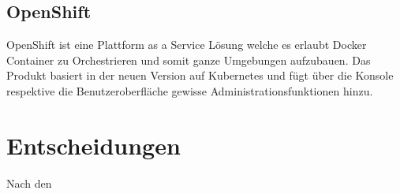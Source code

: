 \subsection{OpenShift}

OpenShift ist eine Plattform as a Service Lösung welche es erlaubt Docker Container zu Orchestrieren und somit ganze Umgebungen aufzubauen. Das Produkt basiert in der neuen Version auf Kubernetes und fügt über die Konsole respektive die Benutzeroberfläche gewisse Administrationsfunktionen hinzu. 

\section{Entscheidungen}

Nach den 